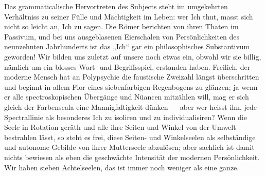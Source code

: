 Das grammaticalische Hervortreten des Subjects steht im umgekehrten Verhältniss zu seiner Fülle und Mächtigkeit im Leben: wer Ich thut, masst sich nicht so leicht an, Ich zu sagen. Die Römer berichten von ihren Thaten im Passivum, und bei uns ausgeblasenen Eierschalen von Persönlichkeiten des neunzehnten Jahrhunderts ist das „Ich“ gar ein philosophisches Substantivum geworden! Wir bilden uns zuletzt auf unsere   noch etwas ein, obwohl wir sie billig, nämlich um ein blosses Wort- und Begriffsspiel, erstanden haben. Freilich, der moderne Mensch hat an Polypsychie die faustische Zweizahl längst überschritten und beginnt in allem Flor eines siebenfarbigen Regenbogens zu glänzen; ja wenn er alle spectroskopischen Übergänge und Nüancen mitzählen will, mag er sich gleich der Farbenscala eine  Mannigfaltigkeit dünken — aber wer heisst ihn, jede Spectrallinie als besonderes Ich zu isoliren und zu individualisiren? Wenn die Seele in Rotation geräth und alle ihre Seiten und Winkel von der Umwelt bestrahlen lässt, so steht es  frei, diese Seiten- und Winkelseelen als selbständige und autonome Gebilde von ihrer Mutterseele abzulösen; aber sachlich ist damit nichts bewiesen als eben die geschwächte Intensität der modernen Persönlichkeit. Wir haben sieben Achtelseelen, das ist immer noch weniger als eine ganze.
\par

